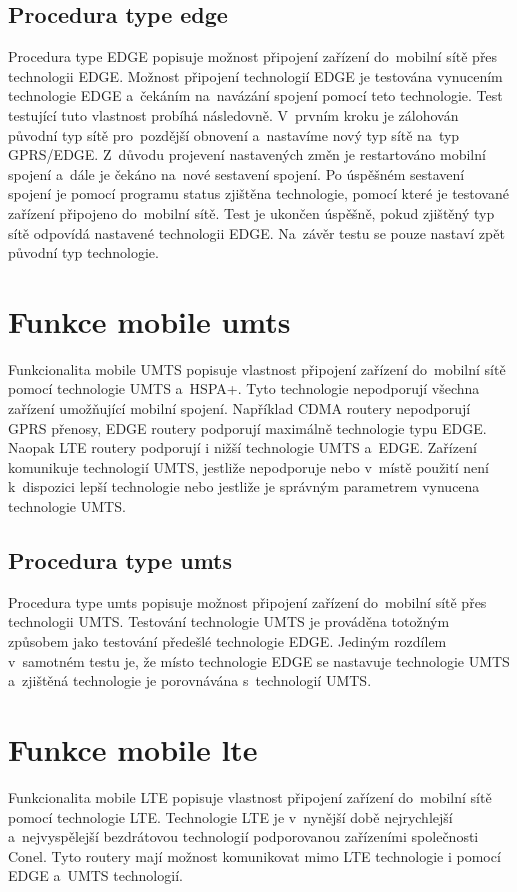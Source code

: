\subsection{Procedura type edge}
Procedura type EDGE popisuje možnost připojení zařízení do~mobilní sítě přes technologii EDGE. Možnost připojení technologií EDGE je testována vynucením technologie EDGE a~čekáním na~navázání spojení pomocí teto technologie. Test testující tuto vlastnost probíhá následovně. V~prvním kroku je zálohován původní typ sítě pro~pozdější obnovení a~nastavíme nový typ sítě na~typ GPRS/EDGE. Z~důvodu projevení nastavených změn je restartováno mobilní spojení a~dále je čekáno na~nové sestavení spojení. Po úspěšném sestavení spojení je pomocí programu status zjištěna technologie, pomocí které je testované zařízení připojeno do~mobilní sítě. Test je ukončen úspěšně, pokud zjištěný typ sítě odpovídá nastavené technologii EDGE. Na~závěr testu se pouze nastaví zpět původní typ technologie.

\section{Funkce mobile umts}
Funkcionalita mobile UMTS popisuje vlastnost připojení zařízení do~mobilní sítě pomocí technologie UMTS a~HSPA+. Tyto technologie nepodporují všechna zařízení umožňující mobilní spojení. Například CDMA routery nepodporují GPRS přenosy, EDGE routery podporují maximálně technologie typu EDGE. Naopak LTE routery podporují i nižší technologie UMTS a~EDGE. Zařízení komunikuje technologií UMTS, jestliže nepodporuje nebo v~místě použití není k~dispozici lepší technologie nebo jestliže je správným parametrem vynucena technologie UMTS.

\subsection{Procedura type umts}
Procedura type umts popisuje možnost připojení zařízení do~mobilní sítě přes technologii UMTS. Testování technologie UMTS je prováděna totožným způsobem jako testování předešlé technologie EDGE. Jediným rozdílem v~samotném testu je, že místo technologie EDGE se nastavuje technologie UMTS a~zjištěná technologie je porovnávána s~technologií UMTS.

\section{Funkce mobile lte}
Funkcionalita mobile LTE popisuje vlastnost připojení zařízení do~mobilní sítě pomocí technologie LTE. Technologie LTE je v~nynější době nejrychlejší a~nejvyspělejší bezdrátovou technologií podporovanou zařízeními společnosti Conel. Tyto routery mají možnost komunikovat mimo LTE technologie i pomocí EDGE a~UMTS technologií.

